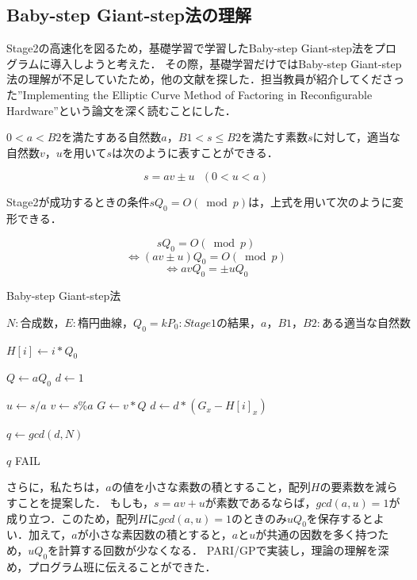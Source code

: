 \documentclass[openany,11pt,papersize]{jsbook}
\begin{document}

\subsection{Baby-step Giant-step法の理解}
Stage2の高速化を図るため，基礎学習で学習したBaby-step Giant-step法をプログラムに導入しようと考えた．
その際，基礎学習だけではBaby-step Giant-step法の理解が不足していたため，他の文献を探した．担当教員が紹介してくださった''Implementing the Elliptic Curve Method of Factoring in Reconfigurable Hardware''\cite{BSGS2006}という論文を深く読むことにした．


$0<a<B2$を満たすある自然数$a$，$B1<s \leq B2$を満たす素数$s$に対して，適当な自然数$v$，$u$を用いて$s$は次のように表すことができる．

\[s=av \pm u \ \ \ (0 < u < a)\]

Stage2が成功するときの条件$sQ_{0}=O (\bmod{p})$は，上式を用いて次のように変形できる．

\[sQ_{0}=O (\bmod{p}) \]
\[ \Longleftrightarrow (av \pm u)Q_{0} = O(\bmod{p})\]
\[ \Longleftrightarrow avQ_{0} = \pm uQ_{0}  \]


\begin{algorithm}[H]
\caption{Baby-step Giant-step法}\label{}
\begin{algorithmic}
\REQUIRE $N: 合成数，E: 楕円曲線，Q_{0}=kP_{0}: Stage1の結果， a，B1，B2: ある適当な自然数$

  \STATE $ H[i] \leftarrow i*Q_{0} $
\ENDFOR

\STATE $Q \leftarrow aQ_{0}$
\STATE $d \leftarrow 1$

  \STATE $u \leftarrow s/a$
  \STATE $v \leftarrow s\%a$
  \STATE $G \leftarrow v*Q$
  \STATE $d \leftarrow d*(G_x-H[i]_x)$
\ENDFOR

\STATE $q \leftarrow gcd(d,N) $

  \RETURN $q$
\ELSE
  \RETURN FAIL
\ENDIF
\end{algorithmic}
\end{algorithm}

さらに，私たちは，$a$の値を小さな素数の積とすること，配列$H$の要素数を減らすことを提案した．
もしも，$s=av+u$が素数であるならば，$gcd(a,u) = 1$が成り立つ．このため，配列$H$に$gcd(a,u) = 1$のときのみ$uQ_{0}$を保存するとよい．加えて，$a$が小さな素因数の積とすると，$a$と$u$が共通の因数を多く持つため，$uQ_{0}$を計算する回数が少なくなる．
PARI/GPで実装し，理論の理解を深め，プログラム班に伝えることができた．
\end{document}

